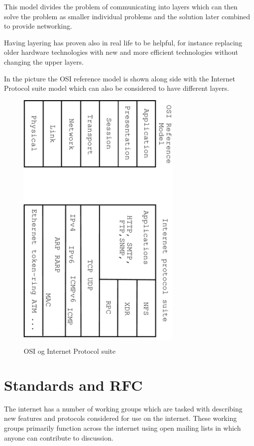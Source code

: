 \documentclass[a4paper,11pt,notitlepage]{report}
\begin{document}
This model divides the problem of communicating into layers which can
then solve the problem as smaller individual problems and the solution
later combined to provide networking.

Having layering has proven also in real life to be helpful, for instance
replacing older hardware technologies with new and more efficient technologies
without changing the upper layers.

In the picture the OSI reference model is shown along side with
the Internet Protocol suite model which can also be considered to have different layers.


\begin{figure}[H]
\label{fig:osi}
\begin{center}
\colorbox{white}{\includegraphics[width=8cm,angle=90]{images/compare-osi-ip.pdf}}
\end{center}
\caption{OSI og Internet Protocol suite}
\end{figure}


\section*{\color{titlecolor}Standards and RFC}

The internet has a number of working groups which are tasked with describing
new features and protocols considered for use on the internet. These
working groups primarily function across the internet using open mailing lists
in which anyone can contribute to discussion.
\end{document}
